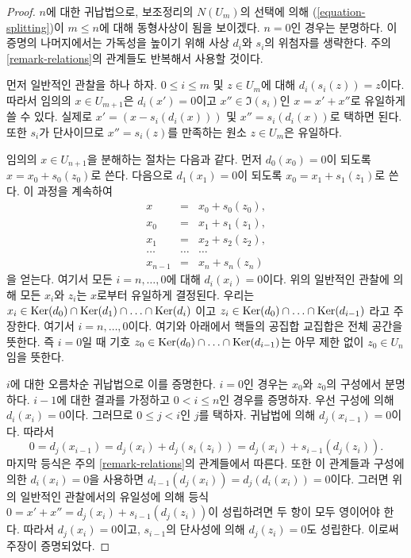 \begin{proof}
$n$에 대한 귀납법으로, 보조정리의 $N(U_m)$의 선택에 의해
(\ref{equation-splitting})이 $m \leq n$에 대해 동형사상이 됨을 보이겠다.
$n = 0$인 경우는 분명하다. 이 증명의 나머지에서는 가독성을 높이기
위해 사상 $d_i$와 $s_i$의 위첨자를 생략한다.
주의 \ref{remark-relations}의 관계들도 반복해서 사용할 것이다.

\medskip\noindent
먼저 일반적인 관찰을 하나 하자.
$0 \leq i \leq m$ 및 $z \in U_m$에 대해 $d_i(s_i(z)) = z$이다.
따라서 임의의 $x \in U_{m + 1}$은
$d_i(x') = 0$이고 $x'' \in \Im(s_i)$인
$x = x' + x''$로 유일하게 쓸 수 있다. 실제로
$x' = (x - s_i(d_i(x)))$ 및 $x'' = s_i(d_i(x))$로 택하면 된다.
또한 $s_i$가 단사이므로 $x'' = s_i(z)$를 만족하는 원소
$z \in U_m$은 유일하다.

\medskip\noindent
임의의 $x \in U_{n + 1}$을 분해하는 절차는 다음과 같다.
먼저 $d_0(x_0) = 0$이 되도록 $x = x_0 + s_0(z_0)$로 쓴다.
다음으로 $d_1(x_1) = 0$이 되도록
$x_0 = x_1 + s_1(z_1)$로 쓴다. 이 과정을 계속하여
\begin{eqnarray*}
x & = & x_0 + s_0(z_0), \\
x_0 & = & x_1 + s_1(z_1), \\
x_1 & = & x_2 + s_2(z_2), \\
\ldots & \ldots & \ldots \\
x_{n - 1} & = & x_n + s_n(z_n)
\end{eqnarray*}
을 얻는다. 여기서 모든 $i = n, \ldots, 0$에 대해
$d_i(x_i) = 0$이다. 위의 일반적인 관찰에 의해 모든 $x_i$와 $z_i$는
$x$로부터 유일하게 결정된다. 우리는
$x_i \in
\mathop{\mathrm{Ker}}(d_0) \cap
\mathop{\mathrm{Ker}}(d_1) \cap
\ldots \cap
\mathop{\mathrm{Ker}}(d_i)$
이고
$z_i \in
\mathop{\mathrm{Ker}}(d_0) \cap
\ldots \cap
\mathop{\mathrm{Ker}}(d_{i - 1})$
라고 주장한다. 여기서 $i = n, \ldots, 0$이다.
여기와 아래에서 핵들의 공집합 교집합은 전체 공간을 뜻한다.
즉 $i = 0$일 때 기호
$z_0 \in \mathop{\mathrm{Ker}}(d_0) \cap
\ldots \cap
\mathop{\mathrm{Ker}}(d_{i - 1})$는 아무 제한 없이 $z_0 \in U_n$임을 뜻한다.

\medskip\noindent
$i$에 대한 오름차순 귀납법으로 이를 증명한다.
$i = 0$인 경우는 $x_0$와 $z_0$의 구성에서 분명하다.
$i - 1$에 대한 결과를 가정하고 $0 < i \leq n$인 경우를 증명하자.
우선 구성에 의해 $d_i(x_i) = 0$이다.
그러므로 $0 \leq j < i$인 $j$를 택하자.
귀납법에 의해 $d_j(x_{i - 1}) = 0$이다. 따라서
$$
0 = d_j(x_{i - 1})
= d_j(x_i) + d_j(s_i(z_i))
= d_j(x_i) + s_{i - 1}(d_j(z_i)).
$$
마지막 등식은 주의 \ref{remark-relations}의 관계들에서 따른다.
또한 이 관계들과 구성에 의한 $d_i(x_i)= 0$을 사용하면
$d_{i - 1}(d_j(x_i)) = d_j(d_i(x_i)) = 0$이다.
그러면 위의 일반적인 관찰에서의 유일성에 의해 등식
$0 = x' + x'' = d_j(x_i) + s_{i - 1}(d_j(z_i))$이 성립하려면
두 항이 모두 영이어야 한다. 따라서 $d_j(x_i) = 0$이고,
$s_{i - 1}$의 단사성에 의해 $d_j(z_i) = 0$도 성립한다.
이로써 주장이 증명되었다.


\end{proof}
